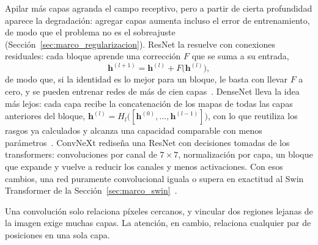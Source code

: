 Apilar más capas agranda el campo receptivo, pero a partir de cierta profundidad aparece la degradación:
agregar capas aumenta incluso el error de entrenamiento, de modo que el problema no es el sobreajuste
(Sección~\ref{sec:marco_regularizacion}). ResNet la resuelve con conexiones residuales: cada bloque aprende una
corrección $F$ que se suma a su entrada,
\begin{equation}
    \mathbf{h}^{(l+1)} = \mathbf{h}^{(l)} + F\bigl(\mathbf{h}^{(l)}\bigr),
    \label{eq:marco_residual}
\end{equation}
de modo que, si la identidad es lo mejor para un bloque, le basta con llevar $F$ a cero, y se pueden entrenar
redes de más de cien capas~\cite{he2015residual}. DenseNet lleva la idea más lejos: cada capa recibe la concatenación de
los mapas de todas las capas anteriores del bloque, $\mathbf{h}^{(l)} = H_l\bigl([\mathbf{h}^{(0)}, \dots,
\mathbf{h}^{(l-1)}]\bigr)$, con lo que reutiliza los rasgos ya calculados y alcanza una capacidad comparable con
menos parámetros~\cite{huang2018densely}. ConvNeXt rediseña una ResNet con decisiones tomadas de los
transformers: convoluciones por canal de $7 \times 7$, normalización por capa, un bloque que expande y vuelve a
reducir los canales y menos activaciones. Con esos cambios, una red puramente convolucional iguala o supera en exactitud
al Swin Transformer de la Sección~\ref{sec:marco_swin}~\cite{liu2022convnet}.

Una convolución solo relaciona píxeles cercanos, y vincular dos regiones lejanas de la imagen exige muchas
capas. La atención, en cambio, relaciona cualquier par de posiciones en una sola capa.
